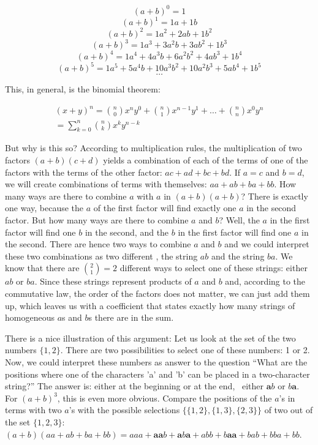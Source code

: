 \documentclass{scrreprt}
\begin{document}
\[
(a + b)^0 = 1
\]
\[
(a + b)^1 = 1a + 1b
\]
\[
(a + b)^2 = 1a^2 + 2ab + 1b^2
\]
\[
(a + b)^3 = 1a^3 + 3a^2b + 3ab^2 + 1b^3
\]
\[
(a + b)^4 = 1a^4 + 4a^3b + 6a^2b^2 + 4ab^3 + 1b^4
\]
\[
(a + b)^5 = 1a^5 + 5a^4b + 10a^3b^2 + 10a^2b^3 + 5ab^4 + 1b^5
\]
\[
\dots
\]

This, in general, is the binomial theorem:

\begin{equation}
\begin{split}
(x + y)^n = \binom{n}{0} x^ny^0 + \binom{n}{1}x^{n-1}y^1 + \dots +
            \binom{n}{n} x^0y^n \\
= \sum_{k=0}^{n}{\binom{n}{k}x^ky^{n-k}}
\end{split}
\end{equation}

But why is this so? 
According to multiplication rules,
the multiplication of two factors $(a+b) (c+d)$
yields a combination of each of the terms
of one of the factors with the terms of the other factor:
$ac + ad + bc + bd$.
If $a = c$ and $b = d$,
we will create combinations of terms with themselves:
$aa + ab + ba + bb$.
How many ways are there
to combine $a$ with $a$ in $(a + b) (a + b)$?
There is exactly one way,
because the $a$ of the first factor
will find exactly one $a$ in the second factor.
But how many ways are there 
to combine $a$ and $b$?
Well, the $a$ in the first factor 
will find one $b$ in the second,
and the $b$ in the first factor 
will find one $a$ in the second.
There are hence two ways to combine $a$ and $b$
and we could interpret these two combinations
as two different ,
the string $ab$ and the string $ba$.
We know that there are $\binom{2}{1} = 2$ different ways
to select one of these strings:
either $ab$ or $ba$.
Since these strings represent products
of $a$ and $b$ and, according to the commutative law,
the order of the factors does not matter,
we can just add them up, which leaves us with 
a coefficient that states exactly how many
strings of homogeneous $a$s and $b$s 
there are in the sum.

There is a nice illustration of this argument:
Let us look at the set of the two numbers $\lbrace 1,2\rbrace$.
There are two possibilities to select one of these numbers: 1 or 2.
Now, we could interpret these numbers as answer to the question
``What are the positions where one of the characters 'a' and 'b'
can be placed in a two-character string?''
The answer is: either at the beginning 
or at the end, \ie\ either $\mathbf{a}b$ 
or $b\mathbf{a}$.
For $(a + b)^3$, this is even more obvious.
Compare the positions of the $a$'s in terms with two $a$'s
with the possible selections
$\lbrace
 \lbrace 1,2\rbrace,
 \lbrace 1,3\rbrace,
 \lbrace 2,3\rbrace
 \rbrace$
of two out of the set $\lbrace 1,2,3\rbrace$:
$(a + b) (aa + ab + ba + bb) = 
 aaa + \mathbf{aa}b + \mathbf{a}b\mathbf{a} + abb + b\mathbf{aa} + bab + bba + bb$.
\end{document}
